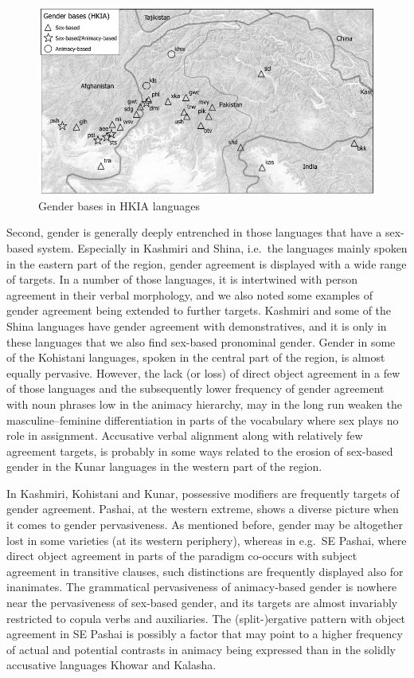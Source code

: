 \documentclass[output=collectionpaper]{langsci/langscibook}
\begin{document}
\begin{figure}[htb]
\includegraphics[width=\textwidth]{figures/10/map2_2}
\caption{Gender bases in HKIA languages}
\label{fig:Lilje:2}
\end{figure}

Second, gender is generally deeply entrenched in those languages that have a sex-based system. Especially in Kashmiri and Shina, i.e.\ the languages mainly spoken in the eastern part of the region, gender agreement is displayed with a wide range of targets. In a number of those languages, it is intertwined with person agreement in their verbal morphology, and we also noted some examples of gender agreement being extended to further targets. Kashmiri and some of the Shina languages have gender agreement with demonstratives, and it is only in these languages that we also find sex-based pronominal gender. Gender in some of the Kohistani languages, spoken in the central part of the region, is almost equally pervasive. However, the lack (or loss) of direct object agreement in a few of those languages and the subsequently lower frequency of gender agreement with noun phrases low in the animacy hierarchy, may in the long run weaken the masculine--feminine differentiation in parts of the vocabulary where sex plays no role in assignment. Accusative verbal alignment along with relatively few agreement targets, is probably in some ways related to the erosion of sex-based gender in the Kunar languages in the western part of the region.

In Kashmiri, Kohistani and Kunar, possessive modifiers are frequently targets of gender agreement. Pashai, at the western extreme, shows a diverse picture when it comes to gender pervasiveness. As mentioned before, gender may be altogether lost in some varieties (at its western periphery), whereas in e.g.\ SE Pashai, where direct object agreement in parts of the paradigm co-occurs with subject agreement in transitive clauses, such distinctions are frequently displayed also for inanimates. The grammatical pervasiveness of animacy-based gender is nowhere near the pervasiveness of sex-based gender, and its targets are almost invariably restricted to copula verbs and auxiliaries. The (split-)ergative pattern with object agreement in SE Pashai is possibly a factor that may point to a higher frequency of actual and potential contrasts in animacy being expressed than in the solidly accusative languages Khowar and Kalasha.
\end{document}
